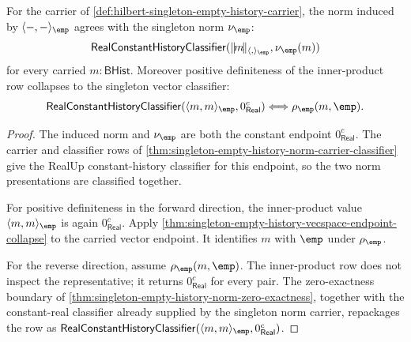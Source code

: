 \begin{theorem}
\label{thm:hilbert-singleton-inner-product-norm-compatibility}
For the carrier of
\autoref{def:hilbert-singleton-empty-history-carrier}, the norm induced by
$\langle-,-\rangle_{\emp}$ agrees with the singleton norm $\nu_{\emp}$:
$$
\mathsf{RealConstantHistoryClassifier}
  (\|\!m\!\|_{\langle,\rangle_{\emp}},\nu_{\emp}(m))
$$
for every carried $m:\mathsf{BHist}$. Moreover positive definiteness of the
inner-product row collapses to the singleton vector classifier:
$$
\mathsf{RealConstantHistoryClassifier}
  (\langle m,m\rangle_{\emp},0_{\mathsf{Real}}^{c})
\Longleftrightarrow
\rho_{\emp}(m,\emp).
$$
\end{theorem}
\begin{proof}
The induced norm and $\nu_{\emp}$ are both the constant endpoint
$0_{\mathsf{Real}}^{c}$. The carrier and classifier rows of
\autoref{thm:singleton-empty-history-norm-carrier-classifier} give the RealUp
constant-history classifier for this endpoint, so the two norm presentations
are classified together.

For positive definiteness in the forward direction, the inner-product value
$\langle m,m\rangle_{\emp}$ is again $0_{\mathsf{Real}}^{c}$. Apply
\autoref{thm:singleton-empty-history-vecspace-endpoint-collapse} to the
carried vector endpoint. It identifies $m$ with $\emp$ under $\rho_{\emp}$.

For the reverse direction, assume $\rho_{\emp}(m,\emp)$. The inner-product row
does not inspect the representative; it returns $0_{\mathsf{Real}}^{c}$ for
every pair. The zero-exactness boundary of
\autoref{thm:singleton-empty-history-norm-zero-exactness}, together with the
constant-real classifier already supplied by the singleton norm carrier,
repackages the row as
$\mathsf{RealConstantHistoryClassifier}
(\langle m,m\rangle_{\emp},0_{\mathsf{Real}}^{c})$.
\end{proof}

